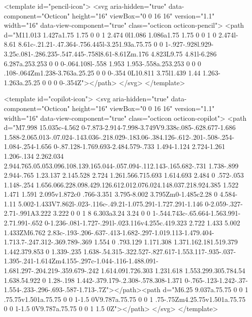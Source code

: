 <template id="pencil-icon">
  <svg aria-hidden="true" data-component="Octicon" height="16" viewBox="0 0 16 16" version="1.1" width="16" data-view-component="true" class="octicon octicon-pencil">
    <path d="M11.013 1.427a1.75 1.75 0 0 1 2.474 0l1.086 1.086a1.75 1.75 0 0 1 0 2.474l-8.61 8.61c-.21.21-.47.364-.756.445l-3.251.93a.75.75 0 0 1-.927-.928l.929-3.25c.081-.286.235-.547.445-.758l8.61-8.61Zm.176 4.823L9.75 4.81l-6.286 6.287a.253.253 0 0 0-.064.108l-.558 1.953 1.953-.558a.253.253 0 0 0 .108-.064Zm1.238-3.763a.25.25 0 0 0-.354 0L10.811 3.75l1.439 1.44 1.263-1.263a.25.25 0 0 0 0-.354Z"></path>
</svg>
</template>

<template id="copilot-icon">
  <svg aria-hidden="true" data-component="Octicon" height="16" viewBox="0 0 16 16" version="1.1" width="16" data-view-component="true" class="octicon octicon-copilot">
    <path d="M7.998 15.035c-4.562 0-7.873-2.914-7.998-3.749V9.338c.085-.628.677-1.686 1.588-2.065.013-.07.024-.143.036-.218.029-.183.06-.384.126-.612-.201-.508-.254-1.084-.254-1.656 0-.87.128-1.769.693-2.484.579-.733 1.494-1.124 2.724-1.261 1.206-.134 2.262.034 2.944.765.05.053.096.108.139.165.044-.057.094-.112.143-.165.682-.731 1.738-.899 2.944-.765 1.23.137 2.145.528 2.724 1.261.566.715.693 1.614.693 2.484 0 .572-.053 1.148-.254 1.656.066.228.098.429.126.612.012.076.024.148.037.218.924.385 1.522 1.471 1.591 2.095v1.872c0 .766-3.351 3.795-8.002 3.795Zm0-1.485c2.28 0 4.584-1.11 5.002-1.433V7.862l-.023-.116c-.49.21-1.075.291-1.727.291-1.146 0-2.059-.327-2.71-.991A3.222 3.222 0 0 1 8 6.303a3.24 3.24 0 0 1-.544.743c-.65.664-1.563.991-2.71.991-.652 0-1.236-.081-1.727-.291l-.023.116v4.255c.419.323 2.722 1.433 5.002 1.433ZM6.762 2.83c-.193-.206-.637-.413-1.682-.297-1.019.113-1.479.404-1.713.7-.247.312-.369.789-.369 1.554 0 .793.129 1.171.308 1.371.162.181.519.379 1.442.379.853 0 1.339-.235 1.638-.54.315-.322.527-.827.617-1.553.117-.935-.037-1.395-.241-1.614Zm4.155-.297c-1.044-.116-1.488.091-1.681.297-.204.219-.359.679-.242 1.614.091.726.303 1.231.618 1.553.299.305.784.54 1.638.54.922 0 1.28-.198 1.442-.379.179-.2.308-.578.308-1.371 0-.765-.123-1.242-.37-1.554-.233-.296-.693-.587-1.713-.7Z"></path><path d="M6.25 9.037a.75.75 0 0 1 .75.75v1.501a.75.75 0 0 1-1.5 0V9.787a.75.75 0 0 1 .75-.75Zm4.25.75v1.501a.75.75 0 0 1-1.5 0V9.787a.75.75 0 0 1 1.5 0Z"></path>
</svg>
</template>

